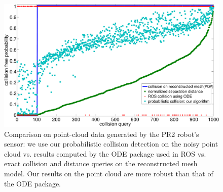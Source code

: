 \begin{figure}[htb]
\centering
\includegraphics[width=0.79\linewidth]{figs/7/pr2res.pdf}
\caption[Comparison of collision checking algorithms with and without considering data uncertainty on point-cloud data generated by PR2 robot sensor]{\label{fig:7:res2} Comparison on point-cloud data generated by the PR2 robot's sensor: we use our probabilistic collision detection on the noisy point
cloud vs. results computed by the ODE package used in ROS vs. exact collision and distance queries on the reconstructed mesh model. Our results on the point cloud
are more robust than that of the ODE package.}
\end{figure}


